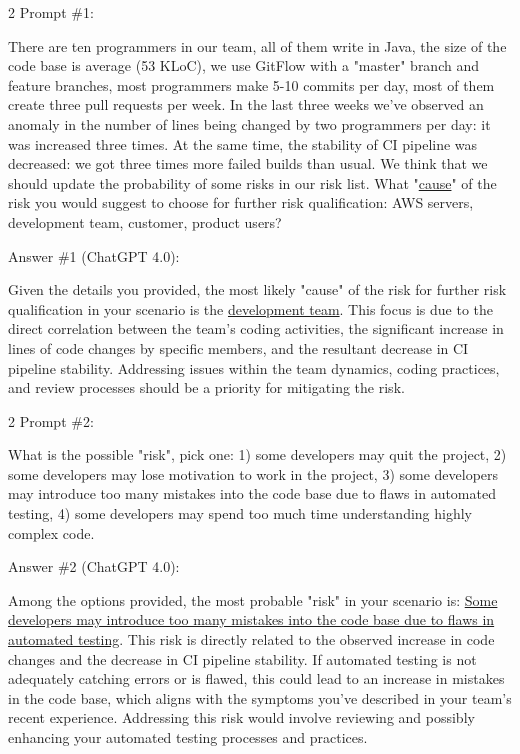 \documentclass{article}
\renewcommand\emph[1]{\ul{#1}}
\begin{document}
\begin{multicols}{2}
Prompt \#1:\par
{\scriptsize There are ten programmers in our team, all of them write in Java, the size of the code base is average (53 KLoC), we use GitFlow with a "master" branch and feature branches, most programmers make 5-10 commits per day, most of them create three pull requests per week. In the last three weeks we've observed an anomaly in the number of lines being changed by two programmers per day: it was increased three times. At the same time, the stability of CI pipeline was decreased: we got three times more failed builds than usual. We think that we should update the probability of some risks in our risk list. What "\emph{cause}" of the risk you would suggest to choose for further risk qualification: AWS servers, development team, customer, product users?\par}
\par\columnbreak\par
Answer \#1 (ChatGPT 4.0):\par
{\scriptsize Given the details you provided, the most likely "cause" of the risk for further risk qualification in your scenario is the \emph{development team}. This focus is due to the direct correlation between the team's coding activities, the significant increase in lines of code changes by specific members, and the resultant decrease in CI pipeline stability. Addressing issues within the team dynamics, coding practices, and review processes should be a priority for mitigating the risk.\par}
\end{multicols}
\plush{}

\begin{multicols}{2}
Prompt \#2:\par
{\scriptsize What is the possible "risk", pick one: 1) some developers may quit the project, 2) some developers may lose motivation to work in the project, 3) some developers may introduce too many mistakes into the code base due to flaws in automated testing, 4) some developers may spend too much time understanding highly complex code.\par}
\par\columnbreak\par
Answer \#2 (ChatGPT 4.0):\par
{\scriptsize Among the options provided, the most probable "risk" in your scenario is: \emph{Some developers may introduce too many mistakes into the code base due to flaws in automated testing}. This risk is directly related to the observed increase in code changes and the decrease in CI pipeline stability. If automated testing is not adequately catching errors or is flawed, this could lead to an increase in mistakes in the code base, which aligns with the symptoms you've described in your team's recent experience. Addressing this risk would involve reviewing and possibly enhancing your automated testing processes and practices.\par}
\end{multicols}
\plush{}
\end{document}
